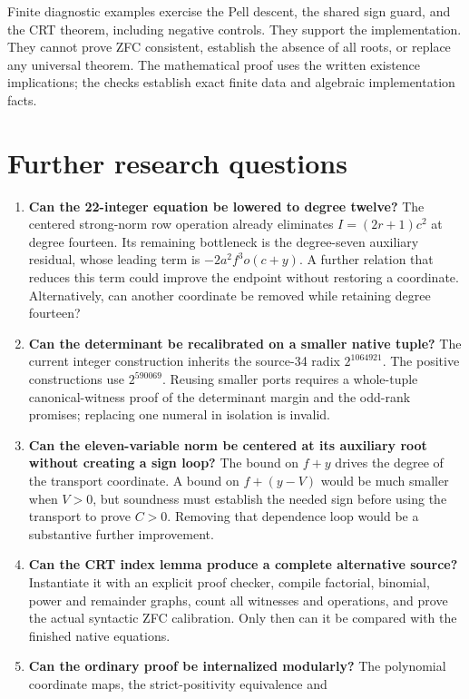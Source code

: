 \documentclass[11pt]{article}
\theoremstyle{remark}\newtheorem{remark}[theorem]{Remark}
\begin{document}
Finite diagnostic examples exercise the Pell descent, the shared sign
guard, and the CRT theorem, including negative controls. They support
the implementation. They cannot prove ZFC consistent, establish the absence
of all roots, or replace any universal theorem. The mathematical proof
uses the written existence implications; the checks establish exact finite
data and algebraic implementation facts.

\section{Further research questions}

\begin{enumerate}
\item \textbf{Can the 22-integer equation be lowered to degree twelve?}
The centered strong-norm row operation already eliminates
$I=(2r+1)c^2$ at degree fourteen. Its remaining bottleneck is the
degree-seven auxiliary residual, whose leading term is
$-2a^2f^3o(c+y)$. A further relation that reduces this term could improve
the endpoint without restoring a coordinate. Alternatively, can another
coordinate be removed while retaining degree fourteen?
\item \textbf{Can the determinant be recalibrated on a smaller native
tuple?} The current integer construction inherits the source-34 radix
$2^{1064921}$. The positive constructions use $2^{590069}$. Reusing smaller
ports requires a whole-tuple canonical-witness proof of the determinant
margin and the odd-rank promises; replacing one numeral in isolation is
invalid.
\item \textbf{Can the eleven-variable norm be centered at its auxiliary
root without creating a sign loop?} The bound on $f+y$ drives the degree
of the transport coordinate. A bound on $f+(y-V)$ would be much smaller
when $V>0$, but soundness must establish the needed sign before using the
transport to prove $C>0$. Removing that dependence loop would be a
substantive further improvement.
\item \textbf{Can the CRT index lemma produce a complete alternative
source?} Instantiate it with an explicit proof checker, compile factorial,
binomial, power and remainder graphs, count all witnesses and operations,
and prove the actual syntactic ZFC calibration. Only then can it be
compared with the finished native equations.
\item \textbf{Can the ordinary proof be internalized modularly?}
The polynomial coordinate maps, the strict-positivity equivalence and

\end{enumerate}
\end{document}
